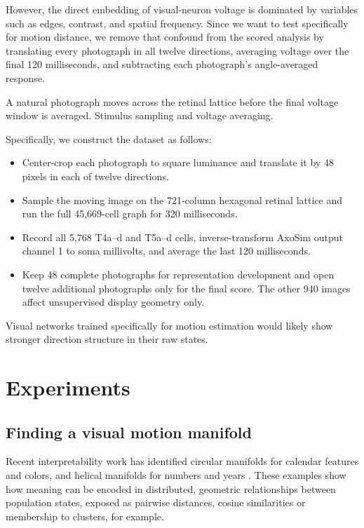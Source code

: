 \documentclass[11pt]{article}
\begin{document}
However, the direct embedding of visual-neuron voltage is dominated by variables such as edges, contrast, and spatial frequency. Since we want to test specifically for motion distance, we remove that confound from the scored analysis by translating every photograph in all twelve directions, averaging voltage over the final 120 milliseconds, and subtracting each photograph's angle-averaged response.

  {A natural photograph moves across the retinal lattice before the final voltage window is averaged.}
  {Stimulus sampling and voltage averaging.}
  
Specifically, we construct the dataset as follows:
  
\begin{itemize}
\tightlist
\item Center-crop each photograph to square luminance and translate it by 48 pixels in each of twelve directions.
\item Sample the moving image on the 721-column hexagonal retinal lattice and run the full 45,669-cell graph for 320 milliseconds.
\item Record all 5,768 T4a--d and T5a--d cells, inverse-transform AxoSim output channel 1 to soma millivolts, and average the last 120 milliseconds.
\item Keep 48 complete photographs for representation development and open twelve additional photographs only for the final score. The other 940 images affect unsupervised display geometry only.
\end{itemize}

Visual networks trained specifically for motion estimation would likely show stronger direction structure in their raw states.

\section{Experiments}

\subsection{Finding a visual motion manifold}

Recent interpretability work has identified circular manifolds for calendar features and colors, and helical manifolds for numbers and years \cite{engels2025,modell2025,kantamneni2025}. These examples show how meaning can be encoded in distributed, geometric relationships between population states, exposed as pairwise distances, cosine similarities or membership to clusters, for example.
\end{document}
